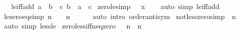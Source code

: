 \begin{isabellebody}
\ \ \ le{\isacharunderscore}{\kern0pt}iff{\isacharunderscore}{\kern0pt}add{\isacharcolon}{\kern0pt}\ {\isachardoublequoteopen}a\ {\isasymle}\ b\ {\isasymlongleftrightarrow}\ {\isacharparenleft}{\kern0pt}{\isasymexists}c{\isachardot}{\kern0pt}\ b\ {\isacharequal}{\kern0pt}\ a\ {\isacharplus}{\kern0pt}\ c{\isacharparenright}{\kern0pt}{\isachardoublequoteclose}\isanewline
{}\isanewline
\isanewline
{}\isamarkupfalse%
\ zero{\isacharunderscore}{\kern0pt}le{\isacharbrackleft}{\kern0pt}simp{\isacharbrackright}{\kern0pt}{\isacharcolon}{\kern0pt}\ {\isachardoublequoteopen}{}\ {\isasymle}\ x{\isachardoublequoteclose}\isanewline
%
\isadelimproof
\ \ %
\endisadelimproof
%
\isatagproof
{}\isamarkupfalse%
\ {\isacharparenleft}{\kern0pt}auto\ simp{\isacharcolon}{\kern0pt}\ le{\isacharunderscore}{\kern0pt}iff{\isacharunderscore}{\kern0pt}add{\isacharparenright}{\kern0pt}%
\endisatagproof
{\isafoldproof}%
%
\isadelimproof
\isanewline
%
\endisadelimproof
\isanewline
{}\isamarkupfalse%
\ le{\isacharunderscore}{\kern0pt}zero{\isacharunderscore}{\kern0pt}eq{\isacharbrackleft}{\kern0pt}simp{\isacharbrackright}{\kern0pt}{\isacharcolon}{\kern0pt}\ {\isachardoublequoteopen}n\ {\isasymle}\ {}\ {\isasymlongleftrightarrow}\ n\ {\isacharequal}{\kern0pt}\ {}{\isachardoublequoteclose}\isanewline
%
\isadelimproof
\ \ %
\endisadelimproof
%
\isatagproof
{}\isamarkupfalse%
\ {\isacharparenleft}{\kern0pt}auto\ intro{\isacharcolon}{\kern0pt}\ order{\isachardot}{\kern0pt}antisym{\isacharparenright}{\kern0pt}%
\endisatagproof
{\isafoldproof}%
%
\isadelimproof
\isanewline
%
\endisadelimproof
\isanewline
{}\isamarkupfalse%
\ not{\isacharunderscore}{\kern0pt}less{\isacharunderscore}{\kern0pt}zero{\isacharbrackleft}{\kern0pt}simp{\isacharbrackright}{\kern0pt}{\isacharcolon}{\kern0pt}\ {\isachardoublequoteopen}{\isasymnot}\ n\ {\isacharless}{\kern0pt}\ {}{\isachardoublequoteclose}\isanewline
%
\isadelimproof
\ \ %
\endisadelimproof
%
\isatagproof
{}\isamarkupfalse%
\ {\isacharparenleft}{\kern0pt}auto\ simp{\isacharcolon}{\kern0pt}\ less{\isacharunderscore}{\kern0pt}le{\isacharparenright}{\kern0pt}%
\endisatagproof
{\isafoldproof}%
%
\isadelimproof
\isanewline
%
\endisadelimproof
\isanewline
{}\isamarkupfalse%
\ zero{\isacharunderscore}{\kern0pt}less{\isacharunderscore}{\kern0pt}iff{\isacharunderscore}{\kern0pt}neq{\isacharunderscore}{\kern0pt}zero{\isacharcolon}{\kern0pt}\ {\isachardoublequoteopen}{}\ {\isacharless}{\kern0pt}\ n\ {\isasymlongleftrightarrow}\ n\ {\isasymnoteq}\ {}{\isachardoublequoteclose}\isanewline

\end{isabellebody}
